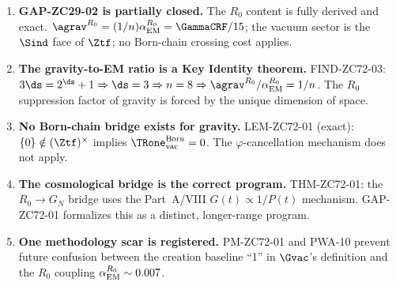 \documentclass[12pt, a4paper]{article}
\renewcommand{\aEM}{\alpha_{\rm EM}}
\begin{document}
\begin{enumerate}[leftmargin=*]

\item \textbf{GAP-ZC29-02 is partially closed.}
The $R_0$ content is fully derived and exact.
$\agrav^{R_0} = (1/n)\aEM^{R_0} = \GammaCRF/15$;
the vacuum sector is the $\Sind$ face of $\Ztf$;
no Born-chain crossing cost applies.

\item \textbf{The gravity-to-EM ratio is a Key Identity theorem.}
FIND-ZC72-03: $3\ds = 2^{\ds}+1 \Rightarrow \ds = 3 \Rightarrow n = 8
\Rightarrow \agrav^{R_0}/\aEM^{R_0} = 1/n$.
The $R_0$ suppression factor of gravity is forced by the
unique dimension of space.

\item \textbf{No Born-chain bridge exists for gravity.}
LEM-ZC72-01 (exact): $\{0\} \notin (\Ztf)^\times$ implies
$\TRone_{\rm vac}^{\rm Born} = 0$.
The $\varphi$-cancellation mechanism does not apply.

\item \textbf{The cosmological bridge is the correct program.}
THM-ZC72-01: the $R_0 \to G_N$ bridge uses the Part~A/VIII
$G(t) \propto 1/P(t)$ mechanism.
GAP-ZC72-01 formalizes this as a distinct, longer-range program.

\item \textbf{One methodology scar is registered.}
PM-ZC72-01 and PWA-10 prevent future confusion between
the creation baseline ``1'' in $\Gvac$'s definition and
the $R_0$ coupling $\aEM^{R_0} \sim 0.007$.

\end{enumerate}

\bigskip
\end{document}
